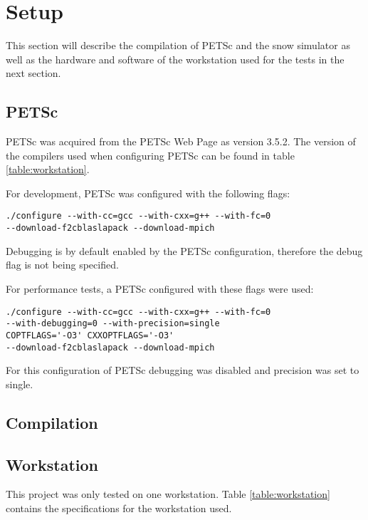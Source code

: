 \section{Setup}

This section will describe the compilation of PETSc and the snow simulator as well 
as the hardware and software of the workstation used for the tests in the next section. 

\subsection{PETSc}

PETSc was acquired from the PETSc Web Page\cite{petsc-web-page} as version 3.5.2. 
The version of the compilers used when configuring PETSc can be found in table 
\ref{table:workstation}.

For development, PETSc was configured with the following flags:
\lstset{language=bash}
\begin{lstlisting}
./configure --with-cc=gcc --with-cxx=g++ --with-fc=0 
--download-f2cblaslapack --download-mpich
\end{lstlisting}
Debugging is by default enabled by the PETSc configuration, therefore the debug 
flag is not being specified.

For performance tests, a PETSc configured with these flags were used:
\lstset{language=bash}
\begin{lstlisting}
./configure --with-cc=gcc --with-cxx=g++ --with-fc=0
--with-debugging=0 --with-precision=single
COPTFLAGS='-O3' CXXOPTFLAGS='-O3' 
--download-f2cblaslapack --download-mpich
\end{lstlisting}
For this configuration of PETSc debugging was disabled and precision was set to 
single. 

\subsection{Compilation}

\subsection{Workstation}

This project was only tested on one workstation. Table \ref{table:workstation} contains 
the specifications for the workstation used.


